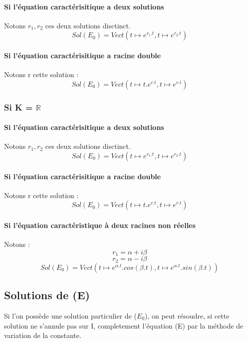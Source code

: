 \paragraph{Si l'équation caractérisitique a deux solutions}
Notons $r_1,r_2$ ces deux solutions disctinct.
$$Sol(E_0) = Vect(t \mapsto e^{r_1.t},t \mapsto e^{r_2.t})$$
\paragraph{Si l'équation caractérisitique a racine double}
Notons r cette solution : 
$$Sol(E_0) = Vect(t \mapsto t.e^{r.t},t \mapsto e^{r.t})$$
\subsubsection{Si K = $\mathbb{R}$}
\paragraph{Si l'équation caractérisitique a deux solutions}
Notons $r_1,r_2$ ces deux solutions disctinct.
$$Sol(E_0) = Vect(t \mapsto e^{r_1.t},t \mapsto e^{r_2.t})$$
\paragraph{Si l'équation caractérisitique a racine double}
Notons r cette solution : 
$$Sol(E_0) = Vect(t \mapsto t.e^{r.t},t \mapsto e^{r.t})$$
\paragraph{Si l'équation caractéristique à deux racines non réelles}
Notons : 
$$r_1 = \alpha + i\beta$$
$$r_2 = \alpha - i\beta$$
$$Sol(E_0) = Vect(t \mapsto e^{\alpha.t}.cos(\beta.t),t \mapsto e^{\alpha.t}.sin(\beta.t))$$
\subsection{Solutions de (E)}
Si l'on possède une solution particulier de ($E_0$), on peut résoudre, si cette solution ne s'annule pas sur I, completement l'équation (E) par la méthode de variation de la constante.
